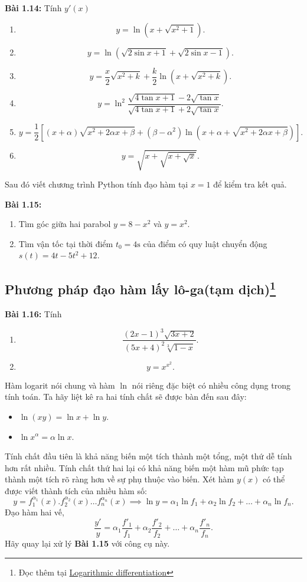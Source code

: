 \textbf{Bài 1.14:} Tính \(y'(x)\)
\begin{enumerate}[label=(\alph*)]
    \item \[y=\ln (x+\sqrt{x^2 +1}).\]
    \item \[y=\ln (\sqrt{2\sin x +1}+\sqrt{2\sin x -1}).\]
    \item \[y=\frac{x}{2}\sqrt{x^2 +k}+\frac{k}{2}\ln (x+\sqrt{x^2 +k}).\]
    \item \[y=\ln^2 \frac{\sqrt{4\tan x +1}-2\sqrt{\tan x}}{\sqrt{4\tan x +1}+2\sqrt{\tan x}}.\]
    \item \[y=\frac{1}{2}[(x+\alpha)\sqrt{x^2 +2\alpha x +\beta}+(\beta -\alpha^2)\ln(x+\alpha+\sqrt{x^2 +2\alpha x+\beta})].\]
    \item \[y=\sqrt{x+\sqrt{x+\sqrt{x}}}.\]
\end{enumerate}
Sau đó viết chương trình Python tính đạo hàm tại \(x=1\) để kiểm tra kết quả. 
\vspace{5pt}

\textbf{Bài 1.15:}
\begin{enumerate}[label=(\alph*)]
    \item Tìm góc giữa hai parabol \(y=8-x^2\) và \(y=x^2\).
    \item Tìm vận tốc tại thời điểm \(t_0 =4\mathrm{s}\) của điểm có quy luật chuyển động \(s(t)=4t-5t^2+12\).
\end{enumerate}

\subsection*{Phương pháp đạo hàm lấy lô-ga(tạm dịch)\footnote{Đọc thêm tại \href{https://en.wikipedia.org/wiki/Logarithmic_differentiation}{Logarithmic differentiation}}}
\textbf{Bài 1.16:} Tính 
\begin{enumerate}[label=(\alph*)]
    \item \[\frac{(2x-1)^3 \sqrt{3x+2}}{(5x+4)^2 \sqrt[3]{1-x}}.\]
    \item \[y=x^{x^2}.\]
\end{enumerate}
Hàm logarit nói chung và hàm \(\ln\) nói riêng đặc biệt có nhiều công dụng trong tính toán. Ta hãy liệt kê ra hai tính chất sẽ được bàn đến sau đây:
\begin{itemize}
    \item \(\ln(xy)=\ln x +\ln y \).
    \item \(\ln x^{\alpha} = \alpha \ln x\).
\end{itemize}
Tính chất đầu tiên là khả năng biến một tích thành một tổng, một thứ dễ tính hơn rất nhiều. Tính chất thứ hai lại có khả năng biến một hàm mũ phức tạp thành một tích rõ ràng hơn về sự phụ thuộc vào biến. \newline
Xét hàm \(y(x)\) có thể được viết thành tích của nhiều hàm số: \[y=f_{1}^{\alpha_1}(x).f_{2}^{\alpha_2}(x)\dots f_{n}^{\alpha_n}(x)\implies \ln y = \alpha_{1}\ln f_1 +\alpha_{2}\ln f_2 +\dots +\alpha_{n}\ln f_n.\]
Đạo hàm hai vế, \[\frac{y'}{y}=\alpha_{1} \frac{f'_1}{f_1}+\alpha_{2} \frac{f'_2}{f_2}+\dots +\alpha_{n} \frac{f'_n}{f_n}.\]
Hãy quay lại xử lý \textbf{Bài 1.15}  với công cụ này.
\vspace{5pt}

